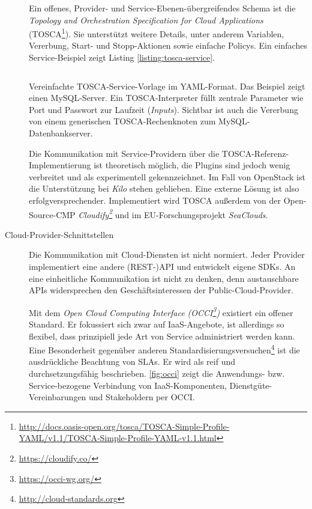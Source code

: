 \begin{description}
	Ein offenes, Provider- und Service-Ebenen-übergreifendes Schema ist die \emph{Topology and Orchestration Specification for Cloud Applications} (TOSCA\footnote{\url{http://docs.oasis-open.org/tosca/TOSCA-Simple-Profile-YAML/v1.1/TOSCA-Simple-Profile-YAML-v1.1.html}}). Sie unterstützt	weitere Details, unter anderem Variablen, Vererbung, Start- und Stopp-Aktionen sowie einfache Policys. Ein einfaches Service-Beispiel zeigt Listing \ref{listing:tosca-service}.
	
	
	\begin{listing}[ht]	
		\inputminted[]{yaml}{./src/TOSCA.service.sample.yaml}
		\caption{Vereinfachte TOSCA-Service-Vorlage im YAML-Format. Das Beispiel zeigt einen MySQL-Server. Ein TOSCA-Interpreter füllt zentrale Parameter wie Port und Passwort zur Laufzeit (\emph{Inputs}). Sichtbar ist auch die Vererbung von einem generischen TOSCA-Rechenknoten zum MySQL-Datenbankserver.}
		\label{listing:tosca-service}
	\end{listing}
	
	Die Kommunikation mit Service-Providern über die TOSCA-Referenz-Implementierung ist theoretisch möglich, die Plugins sind jedoch wenig verbreitet und als experimentell gekennzeichnet. Im Fall von OpenStack ist die Unterstützung bei \emph{Kilo} stehen geblieben. Eine externe Lösung ist also erfolgversprechender. Implementiert wird TOSCA außerdem von der Open-Source-CMP \emph{Cloudify\footnote{\url{https://cloudify.co/}}} und im EU-Forschungsprojekt \emph{SeaClouds}.
	
	
	\item[Cloud-Provider-Schnittstellen] Die Kommunikation mit Cloud-Diensten ist nicht normiert. Jeder Provider implementiert eine andere (REST-)API und entwickelt eigene SDKs. An eine einheitliche Kommunikation ist nicht zu denken, denn austauschbare APIs widersprechen den Geschäftsinteressen der Public-Cloud-Provider.
	
	Mit dem \emph{Open Cloud Computing Interface (OCCI\footnote{\url{https://occi-wg.org/}})} existiert ein offener Standard. Er fokussiert sich zwar auf IaaS-Angebote, ist allerdings so flexibel, dass prinzipiell jede Art von Service administriert werden kann. Eine Besonderheit gegenüber anderen Standardisierungsversuchen\footnote{\url{http://cloud-standards.org}} ist die ausdrückliche Beachtung von SLAs. Er wird als reif und durchsetzungsfähig beschrieben. 
	\autoref{fig:occi} zeigt die Anwendungs- bzw. Service-bezogene Verbindung von IaaS-Komponenten, Dienstgüte-Vereinbarungen und Stakeholdern per OCCI.
	

\end{description}
